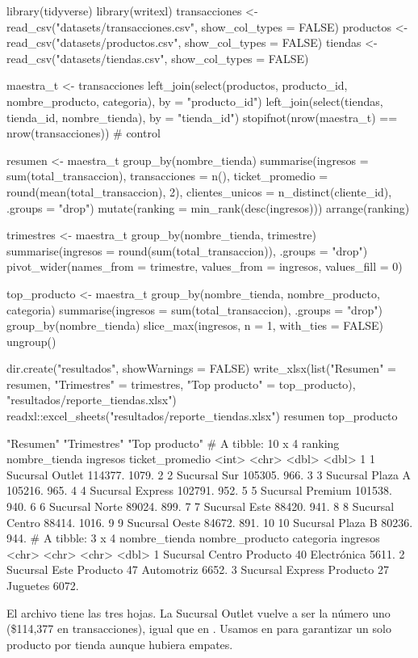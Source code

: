 \begin{rcode}
library(tidyverse)
library(writexl)
transacciones <- read_csv("datasets/transacciones.csv",
                          show_col_types = FALSE)
productos <- read_csv("datasets/productos.csv", show_col_types = FALSE)
tiendas   <- read_csv("datasets/tiendas.csv", show_col_types = FALSE)

maestra_t <- transacciones %
  left_join(select(productos, producto_id, nombre_producto, categoria),
            by = "producto_id") %
  left_join(select(tiendas, tienda_id, nombre_tienda), by = "tienda_id")
stopifnot(nrow(maestra_t) == nrow(transacciones))   # control

resumen <- maestra_t %
  group_by(nombre_tienda) %
  summarise(ingresos = sum(total_transaccion), transacciones = n(),
            ticket_promedio = round(mean(total_transaccion), 2),
            clientes_unicos = n_distinct(cliente_id), .groups = "drop") %
  mutate(ranking = min_rank(desc(ingresos))) %
  arrange(ranking)

trimestres <- maestra_t %
  group_by(nombre_tienda, trimestre) %
  summarise(ingresos = round(sum(total_transaccion)), .groups = "drop") %
  pivot_wider(names_from = trimestre, values_from = ingresos,
              values_fill = 0)

top_producto <- maestra_t %
  group_by(nombre_tienda, nombre_producto, categoria) %
  summarise(ingresos = sum(total_transaccion), .groups = "drop") %
  group_by(nombre_tienda) %
  slice_max(ingresos, n = 1, with_ties = FALSE) %
  ungroup()

dir.create("resultados", showWarnings = FALSE)
write_xlsx(list("Resumen" = resumen, "Trimestres" = trimestres,
                "Top producto" = top_producto),
           "resultados/reporte_tiendas.xlsx")
readxl::excel_sheets("resultados/reporte_tiendas.xlsx")
resumen %
top_producto %
\end{rcode}
\begin{rsalida}
[1] "Resumen"      "Trimestres"   "Top producto"
# A tibble: 10 x 4
   ranking nombre_tienda    ingresos ticket_promedio
     <int> <chr>               <dbl>           <dbl>
 1       1 Sucursal Outlet   114377.           1079.
 2       2 Sucursal Sur      105305.            966.
 3       3 Sucursal Plaza A  105216.            965.
 4       4 Sucursal Express  102791.            952.
 5       5 Sucursal Premium  101538.            940.
 6       6 Sucursal Norte     89024.            899.
 7       7 Sucursal Este      88420.            941.
 8       8 Sucursal Centro    88414.           1016.
 9       9 Sucursal Oeste     84672.            891.
10      10 Sucursal Plaza B   80236.            944.
# A tibble: 3 x 4
  nombre_tienda    nombre_producto categoria   ingresos
  <chr>            <chr>           <chr>          <dbl>
1 Sucursal Centro  Producto 40     Electrónica    5611.
2 Sucursal Este    Producto 47     Automotriz     6652.
3 Sucursal Express Producto 27     Juguetes       6072.
\end{rsalida}

El archivo tiene las tres hojas. La Sucursal Outlet vuelve a ser la
número uno (\$114,377 en transacciones), igual que en . Usamos
 en  para garantizar un solo
producto por tienda aunque hubiera empates.

